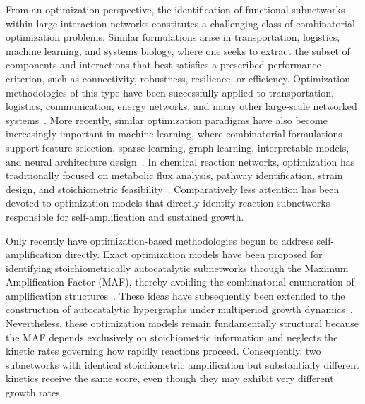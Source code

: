 \documentclass[a4paper,11pt,reqno]{amsart}
\begin{document}
From an optimization perspective, the identification of functional subnetworks within large interaction networks constitutes a challenging class of combinatorial optimization problems. 
Similar formulations arise in transportation, logistics, machine learning, and systems biology, where one seeks to extract the subset of components and interactions that best satisfies a prescribed performance criterion, such as connectivity, robustness, resilience, or efficiency. Optimization methodologies of this type have been successfully applied to transportation, logistics, communication, energy networks, and many other large-scale networked systems~\citep{magnanti1984network,ahuja1988network,LS2019,blanco2025fixed}. More recently, similar optimization paradigms have also become increasingly important in machine learning, where combinatorial formulations support feature selection, sparse learning, graph learning, interpretable models, and neural architecture design~\citep{bertsimas2016best,atamturk2020strong,fischetti2018deep,labbe2019mixed}. In chemical reaction networks, optimization has traditionally focused on metabolic flux analysis, pathway identification, strain design, and stoichiometric feasibility~\citep{orth2010reconstruction,burgard2003optknock,klamt2004hypergraphs}. Comparatively less attention has been devoted to optimization models that directly identify reaction subnetworks responsible for self-amplification and sustained growth.

Only recently have optimization-based methodologies begun to address self-amplification directly. Exact optimization models have been proposed for identifying stoichiometrically autocatalytic subnetworks through the Maximum Amplification Factor (MAF), thereby avoiding the combinatorial enumeration of amplification structures~\citep{gonzalez2024maf,Gagrani2024}. These ideas have subsequently been extended to the construction of autocatalytic hypergraphs under multiperiod growth dynamics~\citep{blanco2026constructing}. Nevertheless, these optimization models remain fundamentally structural because the MAF depends exclusively on stoichiometric information and neglects the kinetic rates governing how rapidly reactions proceed. Consequently, two subnetworks with identical stoichiometric amplification but substantially different kinetics receive the same score, even though they may exhibit very different growth rates.
\end{document}
